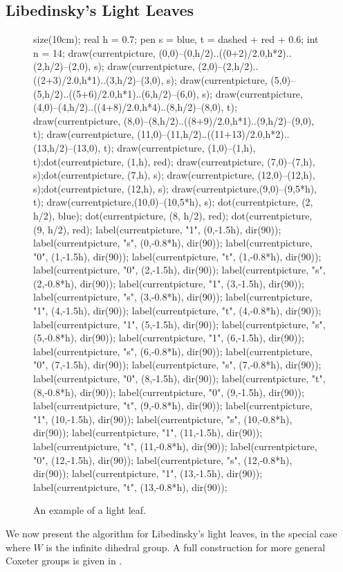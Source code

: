 \subsection{Libedinsky's Light Leaves}
\label{sec:prelim_lightleave}
\begin{figure}[ht]
	\centering
	\begin{asy}
	size(10cm);
	real h = 0.7;
	pen s = blue, t = dashed + red + 0.6;
	int n = 14;
	draw(currentpicture, (0,0)--(0,h/2)..((0+2)/2.0,h*2)..(2,h/2)--(2,0), s);
	draw(currentpicture, (2,0)--(2,h/2)..((2+3)/2.0,h*1)..(3,h/2)--(3,0), s);
	draw(currentpicture, (5,0)--(5,h/2)..((5+6)/2.0,h*1)..(6,h/2)--(6,0), s);
	draw(currentpicture, (4,0)--(4,h/2)..((4+8)/2.0,h*4)..(8,h/2)--(8,0), t);
	draw(currentpicture, (8,0)--(8,h/2)..((8+9)/2.0,h*1)..(9,h/2)--(9,0), t);
	draw(currentpicture, (11,0)--(11,h/2)..((11+13)/2.0,h*2)..(13,h/2)--(13,0), t);
	draw(currentpicture, (1,0)--(1,h), t);dot(currentpicture, (1,h), red);
	draw(currentpicture, (7,0)--(7,h), s);dot(currentpicture, (7,h), s);
	draw(currentpicture, (12,0)--(12,h), s);dot(currentpicture, (12,h), s);
	draw(currentpicture,(9,0)--(9,5*h), t);
	draw(currentpicture,(10,0)--(10,5*h), s);
	dot(currentpicture, (2, h/2), blue);
	dot(currentpicture, (8, h/2), red);
	dot(currentpicture, (9, h/2), red);
	label(currentpicture, "1", (0,-1.5h), dir(90));
	label(currentpicture, "s", (0,-0.8*h), dir(90));
	label(currentpicture, "0", (1,-1.5h), dir(90));
	label(currentpicture, "t", (1,-0.8*h), dir(90));
	label(currentpicture, "0", (2,-1.5h), dir(90));
	label(currentpicture, "s", (2,-0.8*h), dir(90));
	label(currentpicture, "1", (3,-1.5h), dir(90));
	label(currentpicture, "s", (3,-0.8*h), dir(90));
	label(currentpicture, "1", (4,-1.5h), dir(90));
	label(currentpicture, "t", (4,-0.8*h), dir(90));
	label(currentpicture, "1", (5,-1.5h), dir(90));
	label(currentpicture, "s", (5,-0.8*h), dir(90));
	label(currentpicture, "1", (6,-1.5h), dir(90));
	label(currentpicture, "s", (6,-0.8*h), dir(90));
	label(currentpicture, "0", (7,-1.5h), dir(90));
	label(currentpicture, "s", (7,-0.8*h), dir(90));
	label(currentpicture, "0", (8,-1.5h), dir(90));
	label(currentpicture, "t", (8,-0.8*h), dir(90));
	label(currentpicture, "0", (9,-1.5h), dir(90));
	label(currentpicture, "t", (9,-0.8*h), dir(90));
	label(currentpicture, "1", (10,-1.5h), dir(90));
	label(currentpicture, "s", (10,-0.8*h), dir(90));
	label(currentpicture, "1", (11,-1.5h), dir(90));
	label(currentpicture, "t", (11,-0.8*h), dir(90));
	label(currentpicture, "0", (12,-1.5h), dir(90));
	label(currentpicture, "s", (12,-0.8*h), dir(90));
	label(currentpicture, "1", (13,-1.5h), dir(90));
	label(currentpicture, "t", (13,-0.8*h), dir(90));
	\end{asy}
	\caption{An example of a light leaf.}
	\label{fig:lightleaf_example}
\end{figure}
We now present the algorithm for Libedinsky's light leaves, in the special case where $W$ is the infinite dihedral group.  A full construction for more general Coxeter groups is given in \cite{gr4all}.

